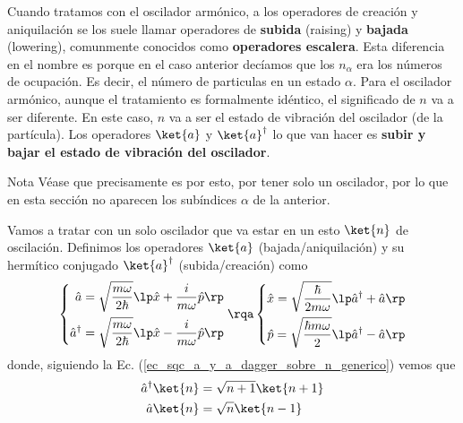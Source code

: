 
        Cuando tratamos con el oscilador armónico, a los operadores de creación y aniquilación se los suele llamar operadores de \textbf{subida} (raising) y \textbf{bajada} (lowering), comunmente conocidos como \textbf{operadores escalera}. Esta diferencia en el nombre es porque en el caso anterior decíamos que los $n_\alpha$ era los números de ocupación. Es decir, el número de particulas en un estado $\alpha$. Para el oscilador armónico, aunque el tratamiento es formalmente idéntico, el significado de $n$ va a ser diferente. En este caso, $n$ va a ser el estado de vibración del oscilador (de la partícula). Los operadores $\ket{a}$ y $\ket{a}^{\dagger}$ lo que van hacer es \textbf{subir y bajar el estado de vibración del oscilador}.

        \begin{mybox_blue}{Nota}
        Véase que precisamente es por esto, por tener solo un oscilador, por lo que en esta sección no aparecen los subíndices $\alpha$ de la anterior. 
        \end{mybox_blue}
        
        Vamos a tratar con un solo oscilador que va estar en un esto $\ket{n}$ de oscilación. Definimos los operadores $\ket{a}$ (bajada/aniquilación) y su hermítico conjugado $\ket{a}^{\dagger}$ (subida/creación) como
        \begin{equation}
            \left\{ 
            \begin{aligned}
                \hat{a} & = \sqrt{\frac{m \omega}{2 \hbar}} \lp \hat{x} + \frac{i}{m \omega} \hat{p} \rp \\
                \hat{a}^{\dagger} & = \sqrt{\frac{m \omega}{2 \hbar}} \lp \hat{x} - \frac{i}{m \omega} \hat{p} \rp
            \end{aligned} 
            \right.
            \rqa
            \left\{
            \begin{aligned}
                \hat{x} = \sqrt{\frac{\hbar}{2 m \omega}} \lp \hat{a}^\dagger + \hat{a} \rp \\
                \hat{p} = \sqrt{\frac{\hbar m \omega}{2}} \lp \hat{a}^\dagger - \hat{a} \rp
            \end{aligned} 
            \right.
        \end{equation}
        donde, siguiendo la Ec. (\ref{ec_sqc_a_y_a_dagger_sobre_n_generico}) vemos que
        \begin{equation}
            \begin{aligned}
                \hat{a}^\dagger \ket{n} &= \sqrt{n+1} \ket{n+1} \\
                \hat{a} \ket{n} &= \sqrt{n} \ket{n-1}
            \end{aligned}
        \end{equation}
        
